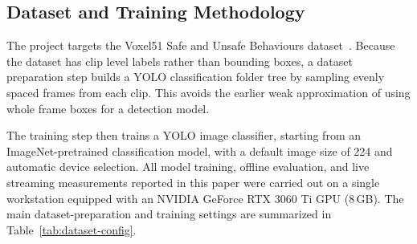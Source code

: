 \documentclass[conference]{IEEEtran}
\begin{document}
\subsection{Dataset and Training Methodology}

The project targets the Voxel51 Safe and Unsafe Behaviours dataset~\cite{b6}.
Because the dataset has
clip level labels rather than bounding boxes, a dataset preparation step builds
a YOLO classification folder tree by sampling evenly spaced frames from each
clip. This avoids the earlier weak approximation of using whole frame boxes for
a detection model.

The training step then trains a YOLO image classifier, starting from an
ImageNet-pretrained classification model, with a default image size of 224 and
automatic device selection. All model training, offline evaluation, and
live streaming measurements reported in this paper were carried out on a single
workstation equipped with an NVIDIA GeForce RTX 3060 Ti GPU (8\,GB). The main
dataset-preparation and training settings are summarized in
Table~\ref{tab:dataset-config}.
\end{document}
